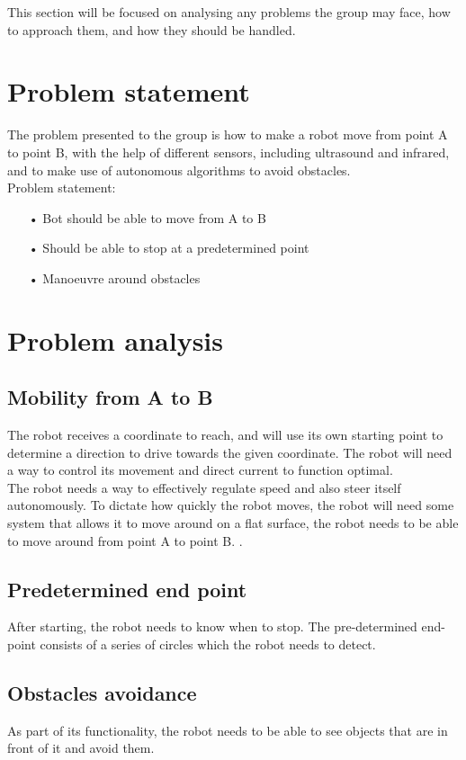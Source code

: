 This section will be focused on analysing any problems the group may face, how to approach them, and how they should be handled.

\section{Problem statement}

The problem presented to the group is how to make a robot move from point A to point B, with the help of different sensors, including ultrasound and infrared, and to make use of autonomous algorithms to avoid obstacles. \\

Problem statement:
\begin{enumerate}
\item[•]Bot should be able to move from A to B
\item[•]Should be able to stop at a predetermined point
\item[•]Manoeuvre around obstacles
\end{enumerate}

\section{Problem analysis}
\subsection{Mobility from A to B}
The robot receives a coordinate to reach, and will use its own starting point to determine a direction to drive towards the given coordinate. The robot will need a way to control its movement and direct current to function optimal.\\
The robot needs a way to effectively regulate speed and also steer itself autonomously. To dictate how quickly the robot moves, the robot will need some system that allows it to move around on a flat surface, the robot needs to be able to move around from point A to point B.
.\

\subsection{Predetermined end point}
After starting, the robot needs to know when to stop. The pre-determined end-point consists of a series of circles which the robot needs to detect. 

\subsection{Obstacles avoidance}
As part of its functionality, the robot needs to be able to see objects that are in front of it and avoid them. 